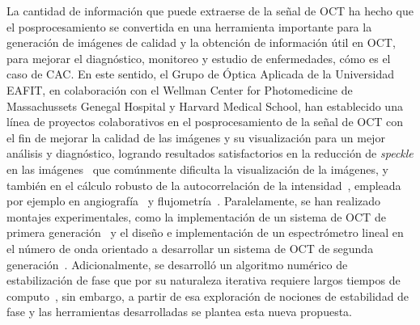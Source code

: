 \documentclass[letter, 12 pt]{article}
\begin{document}

La cantidad de información que puede extraerse de la señal de OCT ha hecho que el posprocesamiento se convertida en una herramienta importante para la generación de imágenes de calidad y la obtención de información útil en OCT, para mejorar el diagnóstico, monitoreo y estudio de enfermedades, cómo es el caso de CAC. En este sentido, el Grupo de Óptica Aplicada de la Universidad EAFIT, en colaboración con el Wellman Center for Photomedicine de Massachussets Genegal Hospital y Harvard Medical School, han establecido una línea de proyectos colaborativos en el posprocesamiento de la señal de OCT con el fin de mejorar la calidad de las imágenes y su visualización para un mejor análisis y diagnóstico, logrando resultados satisfactorios en la reducción de \textit{speckle} en las imágenes~\cite{cuartas-velez2018} que comúnmente dificulta la visualización de la imágenes, y también en el cálculo robusto de la autocorrelación de la intensidad~\cite{Uribe-Patarroyo2020_Noise}, empleada por ejemplo en angiografía~\cite{Makita2006_Optical} y flujometría~\cite{Srinivasan2012_Optical}. Paralelamente, se han realizado montajes experimentales, como la implementación de un sistema de OCT de primera generación~\cite{Cuartas-Velez2019_Labmade} y el diseño e implementación de un espectrómetro lineal en el número de onda orientado a desarrollar un sistema de OCT de segunda generación~\cite{Ruiz-lopera2018_diseno, Ruiz-lopera2018_Design}. Adicionalmente, se desarrolló un algoritmo numérico de estabilización de fase que por su naturaleza iterativa requiere largos tiempos de computo~\cite{cuartas-velez2017}, sin embargo, a partir de esa exploración de nociones de estabilidad de fase y las herramientas desarrolladas se plantea esta nueva propuesta. \\
\end{document}
